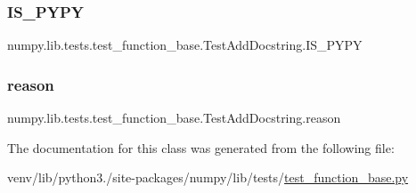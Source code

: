 \subsubsection{\texorpdfstring{I\+S\+\_\+\+P\+Y\+PY}{IS\_PYPY}}
{\footnotesize\ttfamily numpy.\+lib.\+tests.\+test\+\_\+function\+\_\+base.\+Test\+Add\+Docstring.\+I\+S\+\_\+\+P\+Y\+PY\hspace{0.3cm}{\ttfamily [static]}}

\mbox{\label{classnumpy_1_1lib_1_1tests_1_1test__function__base_1_1TestAddDocstring_ad2289d3176821e1c165088661357df69}} 
\subsubsection{\texorpdfstring{reason}{reason}}
{\footnotesize\ttfamily numpy.\+lib.\+tests.\+test\+\_\+function\+\_\+base.\+Test\+Add\+Docstring.\+reason\hspace{0.3cm}{\ttfamily [static]}}



The documentation for this class was generated from the following file\+:\begin{DoxyCompactItemize}
\item 
venv/lib/python3./site-\/packages/numpy/lib/tests/\hyperlink{lib_2tests_2test__function__base_8py}{test\+\_\+function\+\_\+base.\+py}\end{DoxyCompactItemize}
